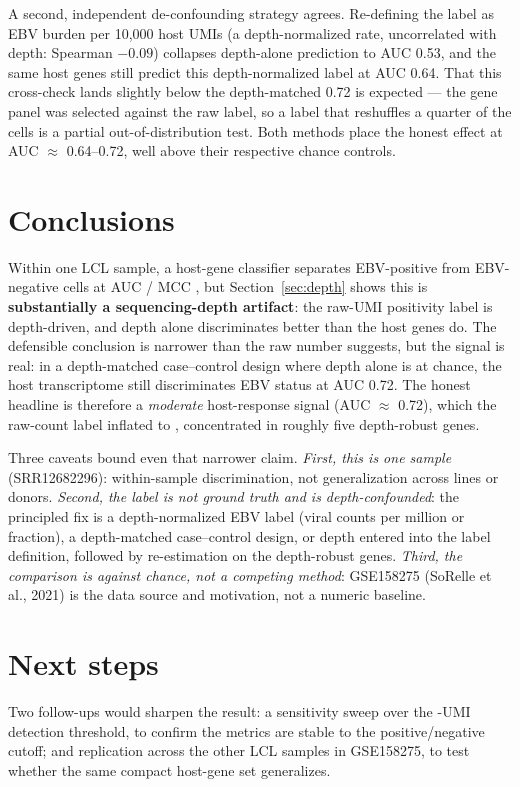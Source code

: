 \documentclass[11pt]{article}
\begin{document}
A second, independent de-confounding strategy agrees. Re-defining the label as EBV
burden per 10{,}000 host UMIs (a depth-normalized rate, uncorrelated with depth:
Spearman $-0.09$) collapses depth-alone prediction to AUC 0.53, and the same host
genes still predict this depth-normalized label at AUC 0.64. That this cross-check
lands slightly below the depth-matched 0.72 is expected --- the gene panel was selected
against the raw label, so a label that reshuffles a quarter of the cells is a partial
out-of-distribution test. Both methods place the honest effect at AUC $\approx$
0.64--0.72, well above their respective chance controls.

\section{Conclusions}
Within one LCL sample, a host-gene classifier separates EBV-positive from
EBV-negative cells at AUC  / MCC ,
but Section~\ref{sec:depth} shows this is \textbf{substantially a sequencing-depth
artifact}: the raw-UMI positivity label is depth-driven, and depth alone
discriminates better than the host genes do. The defensible conclusion is narrower
than the raw number suggests, but the signal is real: in a depth-matched
case--control design where depth alone is at chance, the host transcriptome still
discriminates EBV status at AUC 0.72. The honest headline is therefore a
\emph{moderate} host-response signal (AUC $\approx$ 0.72), which the raw-count label
inflated to , concentrated in roughly five depth-robust genes.

Three caveats bound even that narrower claim. \emph{First, this is one sample}
(SRR12682296): within-sample discrimination, not generalization across lines or
donors. \emph{Second, the label is not ground truth and is depth-confounded}: the
principled fix is a depth-normalized EBV label (viral counts per million or
fraction), a depth-matched case--control design, or depth entered into the label
definition, followed by re-estimation on the depth-robust genes. \emph{Third, the
comparison is against chance, not a competing method}: GSE158275 (SoRelle et al.,
2021) is the data source and motivation, not a numeric baseline.

\section{Next steps}
Two follow-ups would sharpen the result: a sensitivity sweep over the
-UMI detection threshold, to confirm the
metrics are stable to the positive/negative cutoff; and replication across the
other LCL samples in GSE158275, to test whether the same compact host-gene set
generalizes.
\end{document}

